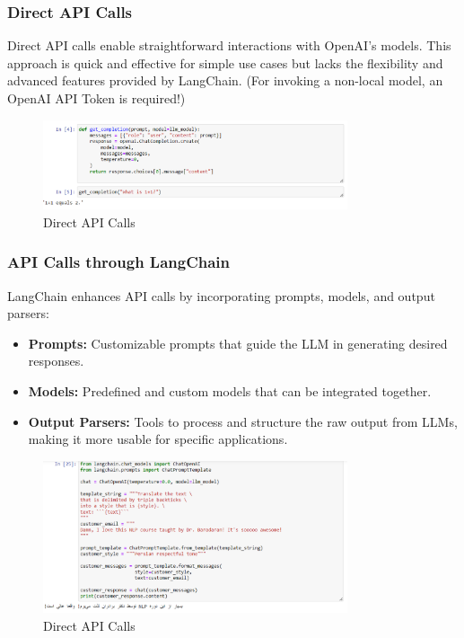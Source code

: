 \documentclass{article}
\begin{document}
\subsubsection{Direct API Calls}
Direct API calls enable straightforward interactions with OpenAI's models. This approach is quick and effective for simple use cases but lacks the flexibility and advanced features provided by LangChain. (For invoking a non-local model, an OpenAI API Token is required!)

\begin{figure}[h]
    \centering
    \includegraphics[width=0.8\textwidth]{Images/DirectAPI.png}
    \caption{Direct API Calls}
    \label{fig:example}
\end{figure}



\subsubsection{API Calls through LangChain}
LangChain enhances API calls by incorporating prompts, models, and output parsers:
\begin{itemize}
  \item \textbf{Prompts:} Customizable prompts that guide the LLM in generating desired responses.
  \item \textbf{Models:} Predefined and custom models that can be integrated together.
  \item \textbf{Output Parsers:} Tools to process and structure the raw output from LLMs, making it more usable for specific applications.
\end{itemize}

\begin{figure}[h]
    \centering
    \includegraphics[width=0.8\textwidth]{Images/LangchainAPI.png}
    \caption{Direct API Calls}
    \label{fig:example}
\end{figure}
\end{document}
